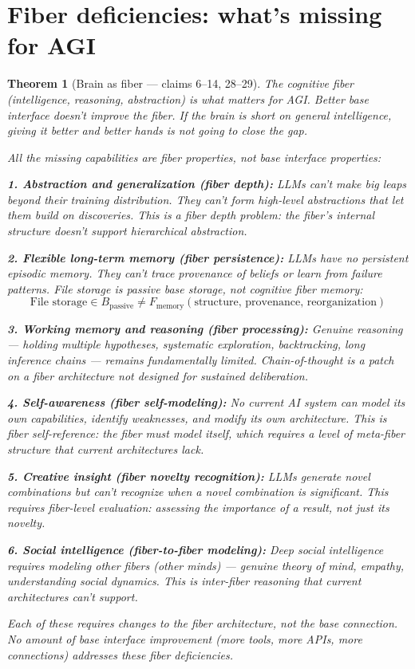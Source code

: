 \documentclass[11pt,a4paper]{article}
\newtheorem{theorem}[definition]{Theorem}
\begin{document}
\section{Fiber deficiencies: what's missing for AGI}
\label{sec:fiber}

\begin{theorem}[Brain as fiber --- claims 6--14, 28--29]
\label{thm:fiber}
The cognitive fiber (intelligence, reasoning, abstraction) is what matters
for AGI. Better base interface doesn't improve the fiber. If the brain
is short on general intelligence, giving it better and better hands is
not going to close the gap.

All the missing capabilities are \emph{fiber properties}, not base
interface properties:

\textbf{1. Abstraction and generalization (fiber depth):}
LLMs can't make big leaps beyond their training distribution. They can't
form high-level abstractions that let them build on discoveries. This is
a fiber depth problem: the fiber's internal structure doesn't support
hierarchical abstraction.

\textbf{2. Flexible long-term memory (fiber persistence):}
LLMs have no persistent episodic memory. They can't trace provenance of
beliefs or learn from failure patterns. File storage is passive base
storage, not cognitive fiber memory:
\[
  \text{File storage} \in B_{\text{passive}} \neq
  F_{\text{memory}}(\text{structure, provenance, reorganization})
\]

\textbf{3. Working memory and reasoning (fiber processing):}
Genuine reasoning --- holding multiple hypotheses, systematic exploration,
backtracking, long inference chains --- remains fundamentally limited.
Chain-of-thought is a patch on a fiber architecture not designed for
sustained deliberation.

\textbf{4. Self-awareness (fiber self-modeling):}
No current AI system can model its own capabilities, identify weaknesses,
and modify its own architecture. This is fiber self-reference: the fiber
must model itself, which requires a level of meta-fiber structure that
current architectures lack.

\textbf{5. Creative insight (fiber novelty recognition):}
LLMs generate novel combinations but can't recognize when a novel
combination is significant. This requires fiber-level evaluation:
assessing the \emph{importance} of a result, not just its novelty.

\textbf{6. Social intelligence (fiber-to-fiber modeling):}
Deep social intelligence requires modeling other fibers (other minds) ---
genuine theory of mind, empathy, understanding social dynamics. This is
inter-fiber reasoning that current architectures can't support.

Each of these requires changes to the \emph{fiber architecture}, not the
base connection. No amount of base interface improvement (more tools,
more APIs, more connections) addresses these fiber deficiencies.
\end{theorem}
\end{document}
